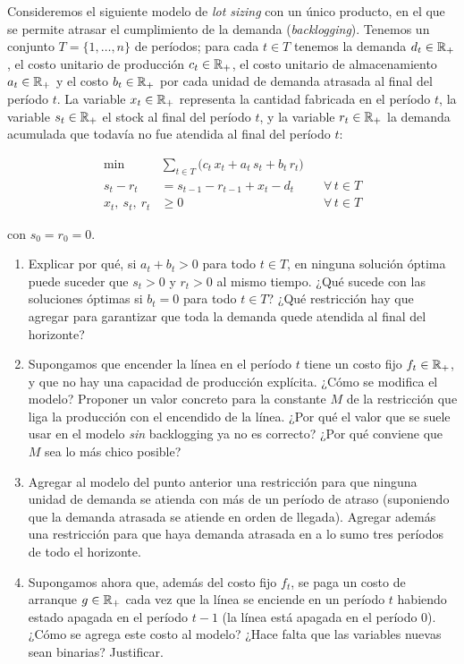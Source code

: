 \documentclass[11pt,a4paper]{article}
\begin{document}

Consideremos el siguiente modelo de \emph{lot sizing} con un único producto, en
el que se permite atrasar el cumplimiento de la demanda (\emph{backlogging}).
Tenemos un conjunto $T = \{1,\dots,n\}$ de períodos; para cada $t \in T$ tenemos
la demanda $d_t \in \mathbb{R}_+$, el costo unitario de producción $c_t \in \mathbb{R}_+$, el
costo unitario de almacenamiento $a_t \in \mathbb{R}_+$ y el costo $b_t \in \mathbb{R}_+$ por
cada unidad de demanda atrasada al final del período $t$. La variable
$x_t \in \mathbb{R}_+$ representa la cantidad fabricada en el período $t$, la variable
$s_t \in \mathbb{R}_+$ el stock al final del período $t$, y la variable $r_t \in \mathbb{R}_+$ la
demanda acumulada que todavía no fue atendida al final del período $t$:

\begin{align}
\min \quad & \sum_{t \in T} \big( c_t\, x_t + a_t\, s_t + b_t\, r_t \big) \\
s_t - r_t &= s_{t-1} - r_{t-1} + x_t - d_t && \forall\, t \in T \\
x_t,\ s_t,\ r_t &\ge 0 && \forall\, t \in T
\end{align}

con $s_0 = r_0 = 0$.

\begin{enumerate}
  \item Explicar por qué, si $a_t + b_t > 0$ para todo $t \in T$, en ninguna
  solución óptima puede suceder que $s_t > 0$ y $r_t > 0$ al mismo tiempo.
  ¿Qué sucede con las soluciones óptimas si $b_t = 0$ para todo $t \in T$?
  ¿Qué restricción hay que agregar para garantizar que toda la demanda quede
  atendida al final del horizonte?

  \item Supongamos que encender la línea en el período $t$ tiene un costo fijo
  $f_t \in \mathbb{R}_+$, y que no hay una capacidad de producción explícita. ¿Cómo se
  modifica el modelo? Proponer un valor concreto para la constante $M$ de la
  restricción que liga la producción con el encendido de la línea. ¿Por qué el
  valor que se suele usar en el modelo \emph{sin} backlogging ya no es
  correcto? ¿Por qué conviene que $M$ sea lo más chico posible?

  \item Agregar al modelo del punto anterior una restricción para que ninguna
  unidad de demanda se atienda con más de un período de atraso (suponiendo que
  la demanda atrasada se atiende en orden de llegada). Agregar además una
  restricción para que haya demanda atrasada en a lo sumo tres períodos de todo
  el horizonte.

  \item Supongamos ahora que, además del costo fijo $f_t$, se paga un costo de
  arranque $g \in \mathbb{R}_+$ cada vez que la línea se enciende en un período $t$
  habiendo estado apagada en el período $t-1$ (la línea está apagada en el
  período 0). ¿Cómo se agrega este costo al modelo? ¿Hace falta que las
  variables nuevas sean binarias? Justificar.
\end{enumerate}
\end{document}
